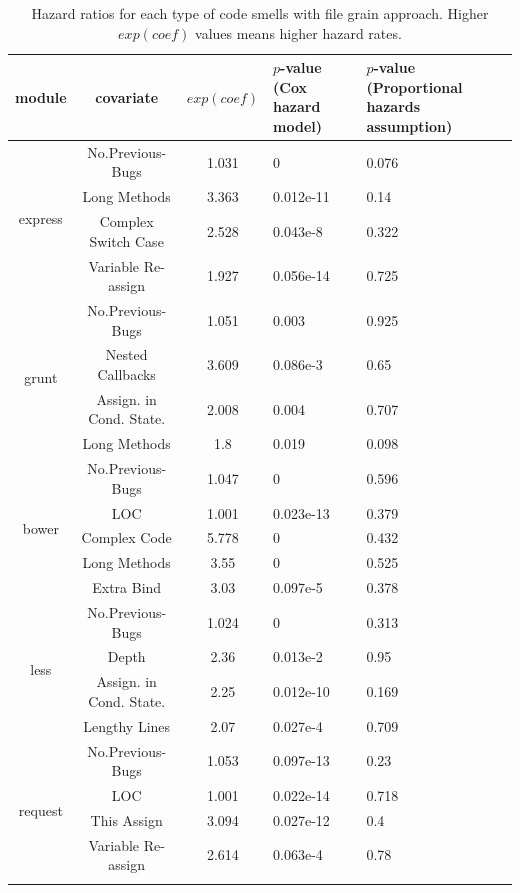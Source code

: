 \begin{table}[t]
\centering
\scriptsize
\caption{Hazard ratios for each type of code smells with file grain approach. Higher $exp(coef)$ values means higher hazard rates.}
\begin{tabular}{c|c|c|p{1.1cm}|p{1.3cm}}
\hline
module & covariate & $exp(coef)$ & $p$-value (Cox hazard model) & $p$-value (Proportional hazards assumption) \\ \hline
\multirow{4}{*}{express}
 & No.Previous-Bugs & 1.031 & 0 & 0.076 \\ \cline{2-5}
 & Long Methods & 3.363 & 0.012e-11 & 0.14 \\ \cline{2-5}
 & Complex Switch Case & 2.528 & 0.043e-8 & 0.322 \\ \cline{2-5}
 & Variable Re-assign & 1.927 & 0.056e-14 & 0.725  \\ \hline
\multirow{4}{*}{grunt} 
 & No.Previous-Bugs & 1.051 & 0.003 & 0.925 \\ \cline{2-5}
 & Nested Callbacks & 3.609 & 0.086e-3 & 0.65 \\ \cline{2-5}
 & Assign. in Cond. State. & 2.008 & 0.004 & 0.707 \\ \cline{2-5}
 & Long Methods & 1.8 & 0.019 & 0.098 \\ \hline
\multirow{5}{*}{bower}
 & No.Previous-Bugs & 1.047 & 0 & 0.596 \\ \cline{2-5}
 & LOC & 1.001 & 0.023e-13 & 0.379 \\ \cline{2-5}
 & Complex Code & 5.778 & 0 & 0.432 \\ \cline{2-5}
 & Long Methods & 3.55 & 0 & 0.525 \\ \cline{2-5}
 & Extra Bind & 3.03 & 0.097e-5 & 0.378 \\ \hline
\multirow{4}{*}{less}
 & No.Previous-Bugs & 1.024 & 0 & 0.313 \\ \cline{2-5}
 & Depth & 2.36 & 0.013e-2 & 0.95 \\ \cline{2-5}
 & Assign. in Cond. State. & 2.25 & 0.012e-10 & 0.169 \\ \cline{2-5}
 & Lengthy Lines & 2.07 & 0.027e-4 & 0.709 \\ \hline
\multirow{5}{*}{request}
 & No.Previous-Bugs & 1.053 & 0.097e-13 & 0.23 \\ \cline{2-5}
 & LOC & 1.001 & 0.022e-14 & 0.718 \\ \cline{2-5}
 & This Assign & 3.094 & 0.027e-12 & 0.4 \\ \cline{2-5}
 & Variable Re-assign & 2.614 & 0.063e-4 & 0.78 \\ \cline{2-5}

\end{tabular}
\end{table}
